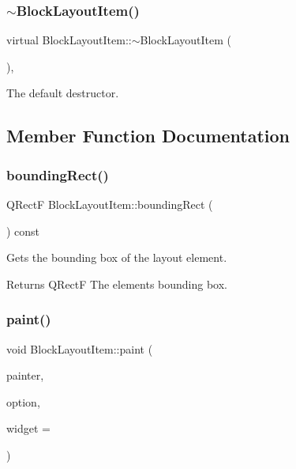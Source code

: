 \subsubsection{\texorpdfstring{$\sim$BlockLayoutItem()}{~BlockLayoutItem()}}
{\footnotesize\ttfamily virtual Block\+Layout\+Item\+::$\sim$\+Block\+Layout\+Item (\begin{DoxyParamCaption}{ }\end{DoxyParamCaption})\hspace{0.3cm}{\ttfamily [virtual]}, {\ttfamily [default]}}



The default destructor. 



\subsection{Member Function Documentation}
\mbox{\label{class_block_layout_item_a6de4f93c0a2cdcccd5fe9f94f1769906}} 
\subsubsection{\texorpdfstring{boundingRect()}{boundingRect()}}
{\footnotesize\ttfamily Q\+RectF Block\+Layout\+Item\+::bounding\+Rect (\begin{DoxyParamCaption}{ }\end{DoxyParamCaption}) const}



Gets the bounding box of the layout element. 

\begin{DoxyReturn}{Returns}
Q\+RectF The element\textquotesingle{}s bounding box. 
\end{DoxyReturn}
\mbox{\label{class_block_layout_item_a418628ab57eed9f9e9857f1a33149c54}} 
\subsubsection{\texorpdfstring{paint()}{paint()}}
{\footnotesize\ttfamily void Block\+Layout\+Item\+::paint (\begin{DoxyParamCaption}\item[{Q\+Painter $\ast$}]{painter,  }\item[{const Q\+Style\+Option\+Graphics\+Item $\ast$}]{option,  }\item[{Q\+Widget $\ast$}]{widget = {} }\end{DoxyParamCaption})}



